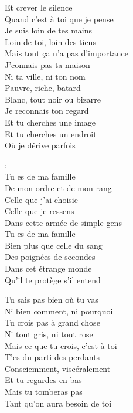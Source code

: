 \documentclass{novel}
\begin{document}
\begin{multicols}{2}
Et crever le silence \\
Quand c'est à toi que je pense \\
Je suis loin de tes mains \\
Loin de toi, loin des tiens \\
Mais tout ça n'a pas d'importance \\

J'connais pas ta maison \\
Ni ta ville, ni ton nom \\
Pauvre, riche, batard \\
Blanc, tout noir ou bizarre \\
Je reconnais ton regard \\

Et tu cherches une image \\
Et tu cherches un endroit \\
Où je dérive parfois \\

\begin{bfseries}
[Refrain]:\\
Tu es de ma famille \\
De mon ordre et de mon rang \\
Celle que j'ai choisie \\
Celle que je ressens \\
Dans cette armée de simple gens \\

Tu es de ma famille \\
Bien plus que celle du sang \\
Des poignées de secondes \\
Dans cet étrange monde \\
Qu'il te protège s'il entend \\
\end{bfseries}

\columnbreak

Tu sais pas bien où tu vas \\
Ni bien comment, ni pourquoi \\
Tu crois pas à grand chose \\
Ni tout gris, ni tout rose \\
Mais ce que tu crois, c'est à toi \\

T'es du parti des perdants \\
Consciemment, viscéralement \\
Et tu regardes en bas \\
Mais tu tomberas pas \\
Tant qu'on aura besoin de toi \\


\end{multicols}
\end{document}
